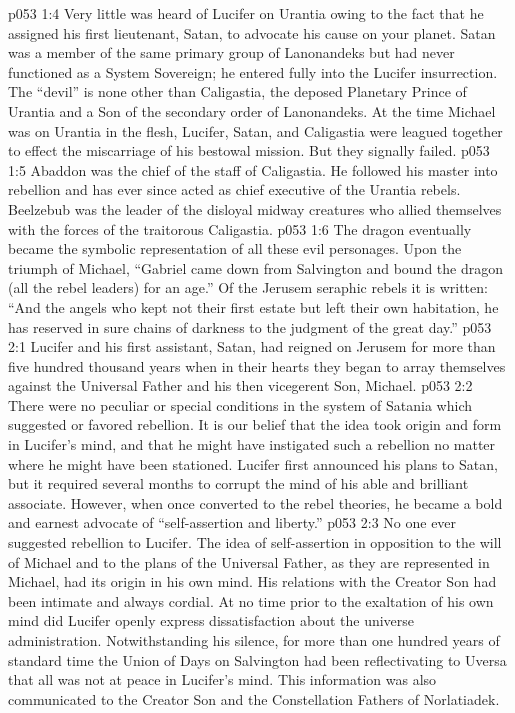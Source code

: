 \vs p053 1:4 Very little was heard of Lucifer on Urantia owing to the fact that he assigned his first lieutenant, Satan, to advocate his cause on your planet. Satan was a member of the same primary group of Lanonandeks but had never functioned as a System Sovereign; he entered fully into the Lucifer insurrection. The “devil” is none other than Caligastia, the deposed Planetary Prince of Urantia and a Son of the secondary order of Lanonandeks. At the time Michael was on Urantia in the flesh, Lucifer, Satan, and Caligastia were leagued together to effect the miscarriage of his bestowal mission. But they signally failed.
\vs p053 1:5 Abaddon was the chief of the staff of Caligastia. He followed his master into rebellion and has ever since acted as chief executive of the Urantia rebels. Beelzebub was the leader of the disloyal midway creatures who allied themselves with the forces of the traitorous Caligastia.
\pc \vs p053 1:6 The dragon eventually became the symbolic representation of all these evil personages. Upon the triumph of Michael, “Gabriel came down from Salvington and bound the dragon (all the rebel leaders) for an age.” Of the Jerusem seraphic rebels it is written: “And the angels who kept not their first estate but left their own habitation, he has reserved in sure chains of darkness to the judgment of the great day.”
\vs p053 2:1 Lucifer and his first assistant, Satan, had reigned on Jerusem for more than five hundred thousand years when in their hearts they began to array themselves against the Universal Father and his then vicegerent Son, Michael.
\vs p053 2:2 There were no peculiar or special conditions in the system of Satania which suggested or favored rebellion. It is our belief that the idea took origin and form in Lucifer’s mind, and that he might have instigated such a rebellion no matter where he might have been stationed. Lucifer first announced his plans to Satan, but it required several months to corrupt the mind of his able and brilliant associate. However, when once converted to the rebel theories, he became a bold and earnest advocate of “self\hyp{}assertion and liberty.”
\pc \vs p053 2:3 No one ever suggested rebellion to Lucifer. The idea of self\hyp{}assertion in opposition to the will of Michael and to the plans of the Universal Father, as they are represented in Michael, had its origin in his own mind. His relations with the Creator Son had been intimate and always cordial. At no time prior to the exaltation of his own mind did Lucifer openly express dissatisfaction about the universe administration. Notwithstanding his silence, for more than one hundred years of standard time the Union of Days on Salvington had been reflectivating to Uversa that all was not at peace in Lucifer’s mind. This information was also communicated to the Creator Son and the Constellation Fathers of Norlatiadek.
